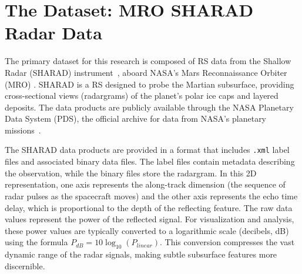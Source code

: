 \section{The Dataset: MRO SHARAD Radar Data}
\label{sec:dataset}
The primary dataset for this research is composed of RS data from the Shallow Radar (SHARAD) instrument~\cite{Seu_2007}, aboard NASA's Mars Reconnaissance Orbiter (MRO) \cite{Zurek_2007}.
SHARAD is a RS designed to probe the Martian subsurface, providing cross-sectional views (radargrams) of the planet's polar ice caps and layered deposits.
The data products are publicly available through the NASA Planetary Data System (PDS), the official archive for data from NASA's planetary missions~\cite{nasa_pds_geosciences}.

The SHARAD data products are provided in a format that includes \texttt{.xml} label files and associated binary data files.
The label files contain metadata describing the observation, while the binary files store the radargram.
In this 2D representation, one axis represents the along-track dimension (the sequence of radar pulses as the spacecraft moves) and the other axis represents the echo time delay, which is proportional to the depth of the reflecting feature.
The raw data values represent the power of the reflected signal. For visualization and analysis, these power values are typically converted to a logarithmic scale (decibels, dB) using the formula $P_{dB} = 10 \log_{10}(P_{linear})$.
This conversion compresses the vast dynamic range of the radar signals, making subtle subsurface features more discernible.

